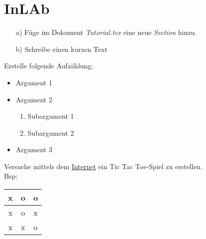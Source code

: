 \section{InLAb}
	
	\begin{aufgabe}
		\begin{itemize}
		\item[a)] Füge im Dokument \textit{\glqq Tutorial.tex\grqq{}} eine neue \textit{Section} hinzu.
		\item[b)] Schreibe einen kurzen Text
		\end{itemize}
	\end{aufgabe}

	
	\begin{aufgabe}
		Erstelle folgende Aufzählung:
		\begin{itemize}	
			\item Argument 1
			\item Argument 2
			\begin{enumerate}
				\item Subargument 1
				\item Subargument 2
			\end{enumerate}
			\item Argument 3
		\end{itemize}
	\end{aufgabe}
	
		
	\begin{aufgabe}
		Versuche mittels dem \href{https://tablesgenerator.com}{Internet} ein Tic Tac Toe-Spiel zu erstellen.\\
		Bsp:
		\begin{tabular}{c|c|c}
			x & o & o\\ \hline
			x & o & x\\ \hline
			x & x & o\\
		\end{tabular}
		
	\end{aufgabe}

